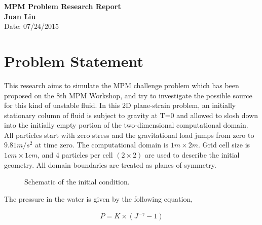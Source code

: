 \documentclass[a4paper, 11pt]{article}
\begin{document}
\noindent

\begin{center}
	\large\textbf{MPM Problem Research Report}\\
	\vspace{6pt}
	\textbf{Juan Liu}\\
	\vspace{6pt}
	\normalsize{Date: 07/24/2015}
\end{center}

\vspace{12pt}

\section{Problem Statement}
This research aims to simulate the MPM challenge problem which has been proposed on the 8th MPM Workshop\cite{mpmworkshop}, and try to investigate the possible source for this kind of unstable fluid. In this 2D plane-strain problem, an initially stationary column of fluid is subject to gravity at T=0 and allowed to slosh down into the initially empty portion of the two-dimensional computational domain. All particles start with zero stress and the gravitational load jumps from zero to $9.81m/s^2$ at time zero. The computational domain is $1m\times2m$. Grid cell size is $1cm\times1cm$, and 4 particles per cell $(2\times2)$ are used to describe the initial geometry. All domain boundaries are treated as planes of symmetry.

\begin{figure}[h]
\centering
{}
\caption{Schematic of the initial condition.}
\end{figure}

\noindent
The pressure in the water is given by the following equation,

\begin{gather*}
	P=K\times(J^{-\gamma} - 1)
\end{gather*}
\end{document}
